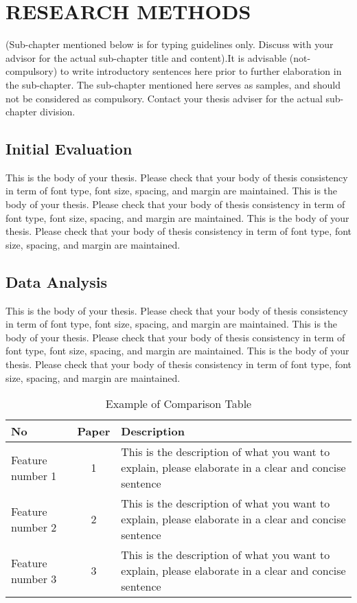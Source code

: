 \chapter{RESEARCH METHODS}
(Sub-chapter mentioned below is for typing guidelines only. Discuss with your advisor for the actual sub-chapter title and content).It is advisable (not-compulsory) to write introductory sentences here prior to further elaboration in the sub-chapter. The sub-chapter mentioned here serves as samples, and should not be considered as compulsory. Contact your thesis adviser for the actual sub-chapter division.

\section{Initial Evaluation}
This is the body of your thesis. Please check that your body of thesis consistency in term of font type, font size, spacing, and margin are maintained. This is the body of your thesis. Please check that your body of thesis consistency in term of font type, font size, spacing, and margin are maintained. This is the body of your thesis. Please check that your body of thesis consistency in term of font type, font size, spacing, and margin are maintained.

\section{Data Analysis}
This is the body of your thesis. Please check that your body of thesis consistency in term of font type, font size, spacing, and margin are maintained. This is the body of your thesis. Please check that your body of thesis consistency in term of font type, font size, spacing, and margin are maintained. This is the body of your thesis. Please check that your body of thesis consistency in term of font type, font size, spacing, and margin are maintained.

\begin{table}
	\centering
	\caption{Example of Comparison Table}
	\begin{tabularx}{\linewidth}{X c X}
			\hline
			\textbf{No} & \textbf{Paper} & \textbf{Description} \\ 
			\hline
			Feature number 1 & 1 & This is the description of what you want to explain, please elaborate in a clear and concise sentence \\
			Feature number 2 & 2 & This is the description of what you want to explain, please elaborate in a clear and concise sentence \\
			Feature number 3 & 3 & This is the description of what you want to explain, please elaborate in a clear and concise sentence \\
			\hline
	\end{tabularx}
	\label{tab:data-analysis-table}
\end{table}

